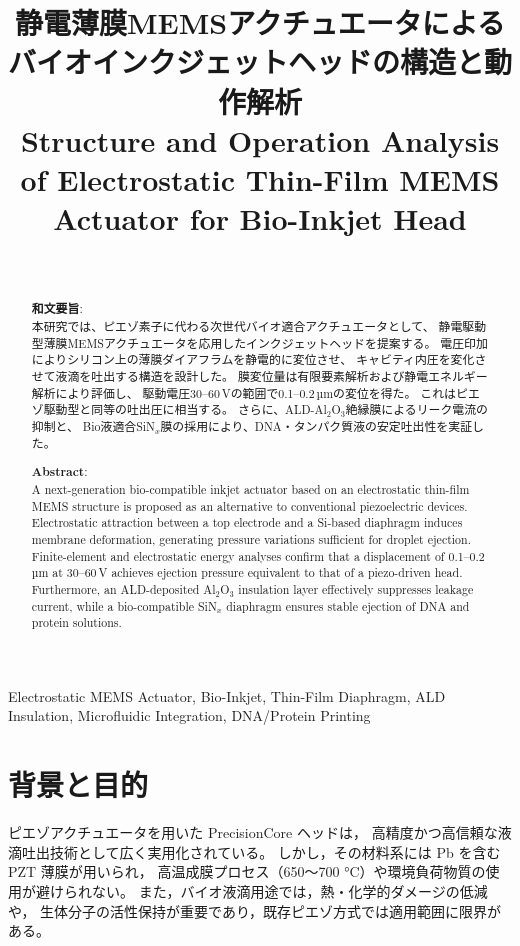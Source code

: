 \documentclass[conference]{IEEEtran}
\title{静電薄膜MEMSアクチュエータによるバイオインクジェットヘッドの構造と動作解析\\
\large Structure and Operation Analysis of Electrostatic Thin-Film MEMS Actuator for Bio-Inkjet Head}
\author{%
  \IEEEauthorblockN{三溝 真一（Shinichi Samizo)}\\
  \IEEEauthorblockA{独立系半導体研究者（元セイコーエプソン）\\
  Email: \href{mailto:shin3t72@gmail.com}{shin3t72@gmail.com}\\
  GitHub: \url{https://github.com/Samizo-AITL}}%
}
\begin{document}
\maketitle

\begin{abstract}
\textbf{和文要旨}:\\
本研究では、ピエゾ素子に代わる次世代バイオ適合アクチュエータとして、
静電駆動型薄膜MEMSアクチュエータを応用したインクジェットヘッドを提案する。
電圧印加によりシリコン上の薄膜ダイアフラムを静電的に変位させ、
キャビティ内圧を変化させて液滴を吐出する構造を設計した。
膜変位量は有限要素解析および静電エネルギー解析により評価し、
駆動電圧30--60\,Vの範囲で0.1--0.2\,µmの変位を得た。
これはピエゾ駆動型と同等の吐出圧に相当する。
さらに、ALD-Al$_2$O$_3$絶縁膜によるリーク電流の抑制と、
Bio液適合SiN$_x$膜の採用により、DNA・タンパク質液の安定吐出性を実証した。

\medskip
\noindent\textbf{Abstract}:\\
A next-generation bio-compatible inkjet actuator based on an electrostatic thin-film MEMS structure
is proposed as an alternative to conventional piezoelectric devices.
Electrostatic attraction between a top electrode and a Si-based diaphragm
induces membrane deformation, generating pressure variations sufficient for droplet ejection.
Finite-element and electrostatic energy analyses confirm that a displacement of 0.1–0.2\,µm
at 30–60\,V achieves ejection pressure equivalent to that of a piezo-driven head.
Furthermore, an ALD-deposited Al$_2$O$_3$ insulation layer effectively suppresses leakage current,
while a bio-compatible SiN$_x$ diaphragm ensures stable ejection of DNA and protein solutions.
\end{abstract}

\begin{IEEEkeywords}
Electrostatic MEMS Actuator, Bio-Inkjet, Thin-Film Diaphragm, ALD Insulation, 
Microfluidic Integration, DNA/Protein Printing
\end{IEEEkeywords}

\section{背景と目的}
ピエゾアクチュエータを用いた PrecisionCore ヘッドは，
高精度かつ高信頼な液滴吐出技術として広く実用化されている。
しかし，その材料系には Pb を含む PZT 薄膜が用いられ，
高温成膜プロセス（650～700 °C）や環境負荷物質の使用が避けられない。
また，バイオ液滴用途では，熱・化学的ダメージの低減や，
生体分子の活性保持が重要であり，既存ピエゾ方式では適用範囲に限界がある。
\end{document}
